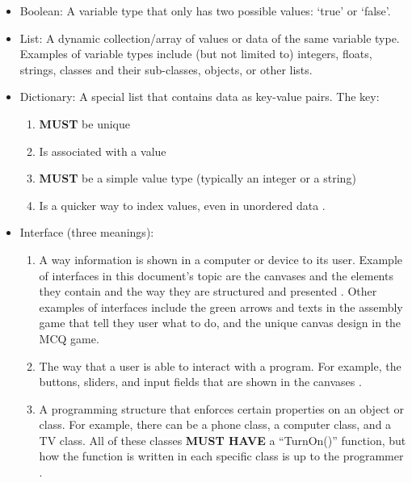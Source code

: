 \documentclass[a4paper, 12pt]{article}
\begin{document}
\begin{itemize}
    \item{Boolean: A variable type that only has two possible values: ‘{\codefont true}’ or ‘{\codefont false}’.}
    \item{List: A dynamic collection/array of values or data of the same variable type. Examples of variable types include (but not limited to) integers, floats, strings, classes and their sub-classes, objects, or other lists.}
    
        \item{Dictionary: A special list that contains data as key-value pairs. The key:
        
        \begin{enumerate}
        
        \item{\textbf{MUST} be unique}
        \item{Is associated with a value}
        \item{\textbf{MUST} be a simple value type (typically an integer or a string)}
        \item{Is a quicker way to index values, even in unordered data \cite{DictionaryMeaning}.}        
        \end{enumerate}        
        }    
    \item{Interface (three meanings):
    \begin{enumerate}
    \item{A way information is shown in a computer or device to its user. Example of interfaces in this document's topic are the canvases and the elements they contain and the way they are structured and presented \cite{InterfaceMeaning}. Other examples of interfaces include the green arrows and texts in the assembly game that tell they user what to do, and the unique canvas design in the \acrshort{MCQ} game.}
    
    \item{The way that a user is able to interact with a program. For example, the buttons, sliders, and input fields that are shown in the canvases \cite{InterfaceMeaning}.}
    
    \item{A programming structure that enforces certain properties on an object or class. For example, there can be a phone class, a computer class, and a TV class. All of these classes \textbf{MUST HAVE} a “{\codefont TurnOn()}” function, but how the function is written in each specific class is up to the programmer \cite{ProgInterfaceMeaning}.}
    
    \end{enumerate}

    }
    
    
 \end{itemize}
\end{document}
